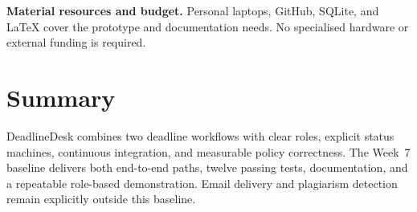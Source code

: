 \documentclass[11pt,a4paper]{article}
\begin{document}
\textbf{Material resources and budget.} Personal laptops, GitHub, SQLite, and
\LaTeX{} cover the prototype and documentation needs. No specialised hardware
or external funding is required.

\section{Summary}

DeadlineDesk combines two deadline workflows with clear roles, explicit status
machines, continuous integration, and measurable policy correctness. The
Week~7 baseline delivers both end-to-end paths, twelve passing tests,
documentation, and a repeatable role-based demonstration. Email delivery and
plagiarism detection remain explicitly outside this baseline.
\end{document}
